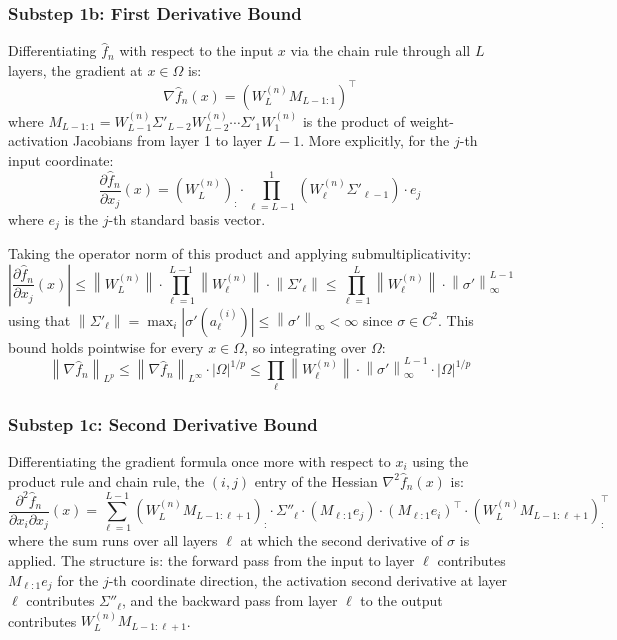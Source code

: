 \documentclass[12pt,a4paper]{article}
\numberwithin{equation}{section}
\theoremstyle{plain}
\theoremstyle{definition}
\newcommand{\norm}[1]{\left\| #1 \right\|}
\newcommand{\fn}{\hat{f}_n}
\newcommand{\abs}[1]{\left| #1 \right|}
\begin{document}
	\subsubsection*{Substep 1b: First Derivative Bound}
	
	Differentiating $\fn$ with respect to the input $x$ via the chain rule
	through all $L$ layers, the gradient at $x \in \Omega$ is:
	\begin{equation}
		\nabla \fn(x) = \left(W_L^{(n)} M_{L-1:1}\right)^\top
	\end{equation}
	where $M_{L-1:1} = W_{L-1}^{(n)} \Sigma'_{L-2} W_{L-2}^{(n)} \cdots
	\Sigma'_1 W_1^{(n)}$ is the product of weight-activation Jacobians from
	layer 1 to layer $L-1$. More explicitly, for the $j$-th input coordinate:
	\begin{equation}
		\frac{\partial \fn}{\partial x_j}(x)
		= \left(W_L^{(n)}\right)_{:} \cdot
		\prod_{\ell=L-1}^{1} \left(W_\ell^{(n)} \Sigma'_{\ell-1}\right) \cdot e_j
	\end{equation}
	where $e_j$ is the $j$-th standard basis vector.
	
	Taking the operator norm of this product and applying submultiplicativity:
	\begin{equation}
		\abs{\frac{\partial \fn}{\partial x_j}(x)}
		\leq \norm{W_L^{(n)}} \cdot \prod_{\ell=1}^{L-1}
		\norm{W_\ell^{(n)}} \cdot \norm{\Sigma'_\ell}
		\leq \prod_{\ell=1}^{L} \norm{W_\ell^{(n)}} \cdot \norm{\sigma'}_\infty^{L-1}
	\end{equation}
	using that $\norm{\Sigma'_\ell} = \max_i |\sigma'(a_\ell^{(i)})| \leq
	\norm{\sigma'}_\infty < \infty$ since $\sigma \in C^2$. This bound holds
	pointwise for every $x \in \Omega$, so integrating over $\Omega$:
	\begin{equation}
		\norm{\nabla \fn}_{L^p}
		\leq \norm{\nabla \fn}_{L^\infty} \cdot |\Omega|^{1/p}
		\leq \prod_\ell \norm{W_\ell^{(n)}} \cdot \norm{\sigma'}_\infty^{L-1}
		\cdot |\Omega|^{1/p}
	\end{equation}
	
	\subsubsection*{Substep 1c: Second Derivative Bound}
	
	Differentiating the gradient formula once more with respect to $x_i$ using
	the product rule and chain rule, the $(i,j)$ entry of the Hessian
	$\nabla^2 \fn(x)$ is:
	\begin{equation}
		\frac{\partial^2 \fn}{\partial x_i \partial x_j}(x)
		= \sum_{\ell=1}^{L-1}
		\left(W_L^{(n)} M_{L-1:\ell+1}\right)_{:}
		\cdot \Sigma''_\ell \cdot
		\left(M_{\ell:1} e_j\right) \cdot
		\left(M_{\ell:1} e_i\right)^\top \cdot
		\left(W_L^{(n)} M_{L-1:\ell+1}\right)_{:}^\top
	\end{equation}
	where the sum runs over all layers $\ell$ at which the second derivative of
	$\sigma$ is applied. The structure is: the forward pass from the input to
	layer $\ell$ contributes $M_{\ell:1} e_j$ for the $j$-th coordinate
	direction, the activation second derivative at layer $\ell$ contributes
	$\Sigma''_\ell$, and the backward pass from layer $\ell$ to the output
	contributes $W_L^{(n)} M_{L-1:\ell+1}$.
	
\end{document}
